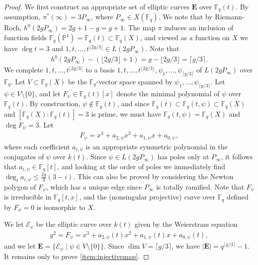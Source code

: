 \documentclass[11pt]{article}
\theoremstyle{plain}
\theoremstyle{definition}
\newcommand{\E}{\mathcal{E}}
\begin{document}
\begin{proof}

We first construct an appropriate set of elliptic curves $\mathbf{E}$ over $\mathbb{F}_q(t)$. By assumption, $\pi^*(\infty)=3P_\infty$, where $P_\infty\in X(\mathbb{F}_q)$.  We note that by Riemann-Roch, $h^0(2gP_\infty)=2g+1-g=g+1$. The map $\pi$ induces an inclusion of function fields $\mathbb{F}_q(\mathbb{P}^1)=\mathbb{F}_q(t)\subset \mathbb{F}_q(X)$, and viewed as a function on $X$ we have $\deg t=3$ and $1,t,\ldots, t^{\lfloor 2g/3\rfloor}\in L(2gP_\infty)$. Note that 
\begin{align*}
h^0(2gP_\infty)-(\lfloor 2g/3\rfloor+1)=g-\lfloor 2g/3\rfloor=\lceil g/3\rceil. 
\end{align*}
We complete $1,t,\ldots, t^{\lfloor 2g/3\rfloor}$ to a basis $1,t,\ldots, t^{\lfloor 2g/3\rfloor}, \psi_1,\ldots, \psi_{\lceil g/3\rceil}$ of $L(2gP_\infty)$ over $\mathbb{F}_q$. Let $V\subset \mathbb{F}_q(X)$ be the $\mathbb{F}_q$-vector space spanned by $\psi_1,\ldots, \psi_{\lceil g/3\rceil}$. Let $\psi\in V\setminus\{0\}$, and let $F_\psi\in \mathbb{F}_q(t)[x]$ denote the minimal polynomial of $\psi$ over $\mathbb{F}_q(t)$. By construction, $\psi\not\in \mathbb{F}_q(t)$, and since $\mathbb{F}_q(t)\subset \mathbb{F}_q(t,\psi)\subset \mathbb{F}_q(X)$ and $[\mathbb{F}_q(X):\mathbb{F}_q(t)]=3$ is prime, we must have $\mathbb{F}_q(t,\psi)=\mathbb{F}_q(X)$ and $\deg F_\psi=3$. Let
\begin{align*}
F_\psi=x^3+a_{2,\psi}x^2+a_{1,\psi}x+a_{0,\psi},
\end{align*}
where each coefficient $a_{i,\psi}$ is an appropriate symmetric polynomial in the conjugates of $\psi$ over $k(t)$. Since $\psi\in L(2gP_\infty)$ has poles only at $P_\infty$, it follows that $a_{i,\psi}\in \mathbb{F}_q[t]$, and looking at the order of poles we immediately find $\deg_t a_{i,\psi}\leq \frac{2g}{3}(3-i)$.  This can also be proved by considering the Newton polygon of $F_\psi$, which has a unique edge since $P_\infty$ is totally ramified. Note that $F_\psi$ is irreducible in $\mathbb{F}_q[t,x]$, and the (nonsingular projective) curve over $\mathbb{F}_q$ defined by $F_\psi=0$ is isomorphic to $X$. 

We let $\E_\psi$ be the elliptic curve over $k(t)$ given by the Weierstrass equation
\begin{align*}
y^2=F_\psi=x^3+a_{2,\psi}(t)x^2+a_{1,\psi}(t)x+a_{0,\psi}(t),
\end{align*}
and we let $\mathbf{E}=\{\E_\psi\mid \psi \in V\setminus \{0\}\}$. Since $\dim V=\lceil g/3\rceil$, we have $|\mathbf{E}|=q^{\lceil g/3\rceil}-1$. It remains only to prove \eqref{item:injectivemap}.


\end{proof}
\end{document}
